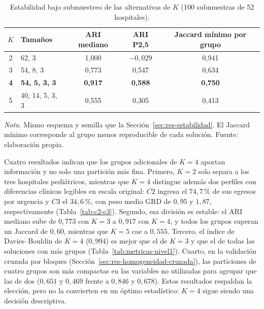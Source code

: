 \begin{table}[htbp]
\centering
\caption{Estabilidad bajo submuestreo de las alternativas de $K$ (100 submuestras de 52 hospitales).}
\label{tab:estabilidad-por-k}
\begin{tabular}{c l c c c}
\toprule
\textbf{$K$} & \textbf{Tamaños} & \textbf{ARI mediano} &
\textbf{ARI P2,5} & \textbf{Jaccard mínimo por grupo} \\
\midrule
2 & 62, 3 & 1,000 & $-0{,}029$ & 0,941 \\
3 & 54, 8, 3 & 0,773 & 0,547 & 0,634 \\
\bfseries 4 & \bfseries 54, 5, 3, 3 & \bfseries 0,917 & \bfseries 0,588 & \bfseries 0,750 \\
5 & 40, 14, 5, 3, 3 & 0,555 & 0,305 & 0,413 \\
\bottomrule
\end{tabular}
\par\smallskip
\begin{minipage}{\textwidth}
\normalsize\raggedright
\textit{Nota.} Mismo esquema y semilla que la Sección~\ref{sec:res-estabilidad}.
El Jaccard mínimo corresponde al grupo menos reproducible de cada solución.
Fuente: elaboración propia.
\end{minipage}
\end{table}

Cuatro resultados indican que los grupos adicionales de $K=4$ aportan
información y no solo una partición más fina. Primero, $K=2$ solo separa a los
tres hospitales pediátricos, mientras que $K=4$ distingue además dos perfiles
con diferencias clínicas legibles en escala original: $C2$ ingresa el
$74{,}7\,\%$ de sus egresos por urgencia y $C3$ el $34{,}6\,\%$, con peso medio
GRD de $0{,}95$ y $1{,}87$, respectivamente (Tabla~\ref{tab:c2-c3}). Segundo,
esa división es estable: el ARI mediano sube de $0{,}773$ con $K=3$ a $0{,}917$
con $K=4$, y todos los grupos superan un Jaccard de $0{,}60$, mientras que
$K=5$ cae a $0{,}555$. Tercero, el índice de Davies--Bouldin de $K=4$
($0{,}994$) es mejor que el de $K=3$ y que el de todas las soluciones con más
grupos (Tabla~\ref{tab:metricas-nivel1}). Cuarto, en la validación cruzada por
bloques (Sección~\ref{sec:res-homogeneidad-cruzada}), las particiones de cuatro
grupos son más compactas en las variables no utilizadas para agrupar que las
de dos ($0{,}651$ y $0{,}469$ frente a $0{,}846$ y $0{,}678$). Estos resultados
respaldan la elección, pero no la convierten en un óptimo estadístico: $K=4$
sigue siendo una decisión descriptiva.


